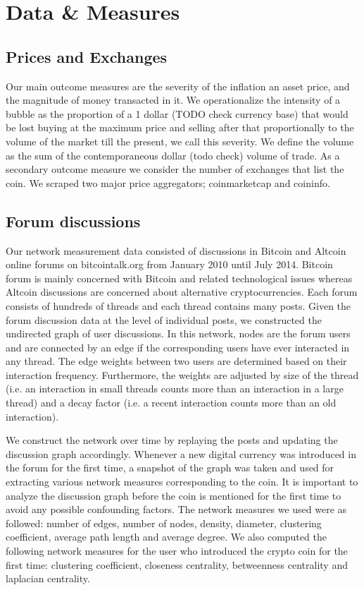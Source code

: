 \section{Data \& Measures}



\subsection{Prices and Exchanges}

Our main outcome measures are the severity of the inflation an asset price, and the magnitude of money transacted in it.
We operationalize the intensity of a bubble as the proportion of a 1 dollar (TODO check currency base) that would be lost buying at the maximum price and selling after that proportionally to the volume of the market till the present, we call this severity.
We define the volume as the sum of the contemporaneous dollar (todo check) volume of trade.
As a secondary outcome measure we consider the number of exchanges that list the coin.
We scraped two major price aggregators; coinmarketcap and coininfo.


\subsection{Forum discussions}


Our network measurement data consisted of discussions in Bitcoin and Altcoin online forums on bitcointalk.org from January 2010 until July 2014. 
Bitcoin forum is mainly concerned with Bitcoin and related technological issues whereas Altcoin discussions are concerned about alternative cryptocurrencies. Each forum consists of hundreds of threads and each thread contains many posts.  Given the forum discussion data at the level of individual posts, we constructed the undirected graph of user discussions. In this network, nodes are the forum users and are connected by an edge if the corresponding users have ever interacted in any thread. The edge weights between two users are determined based on their interaction frequency. Furthermore, the weights are adjusted by size of the thread (i.e. an interaction in small threads counts more than an interaction in a large thread) and a decay factor (i.e. a recent interaction counts more than an old interaction).


We construct the network over time by replaying the posts and updating the discussion graph accordingly.  Whenever a new digital currency was introduced in the forum for the first time, a snapshot of the graph was taken and used for extracting various network measures corresponding to the coin. It is important to analyze the discussion graph before the coin is mentioned for the first time to avoid any possible confounding factors. The network measures we used were as followed: number of edges, number of nodes, density, diameter, clustering coefficient, average path length and average degree. We also computed the following network measures for the user who introduced the crypto coin for the first time: clustering coefficient, closeness centrality, betweenness centrality and laplacian centrality.

